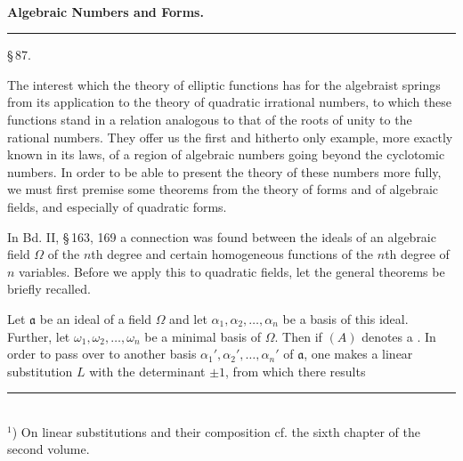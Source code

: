 
\begin{center}
\\[4pt]
\textbf{Algebraic Numbers and Forms.}
\end{center}

\begin{center}
\rule{0.25\textwidth}{0.4pt}
\end{center}

\begin{center}
\S\,87. 
\end{center}

The interest which the theory of elliptic functions has for the algebraist springs from its application to the theory of quadratic irrational numbers, to which these functions stand in a relation analogous to that of the roots of unity to the rational numbers. They offer us the first and hitherto only example, more exactly known in its laws, of a region of algebraic numbers going beyond the cyclotomic numbers. In order to be able to present the theory of these numbers more fully, we must first premise some theorems from the theory of forms and of algebraic fields, and especially of quadratic forms.

In Bd. II, \S\,163, 169 a connection was found between the ideals of an algebraic field $\Omega$ of the $n$th degree and certain homogeneous functions of the $n$th degree of $n$ variables. Before we apply this to quadratic fields, let the general theorems be briefly recalled.

Let $\mathfrak{a}$ be an ideal of a field $\Omega$ and let $\alpha_1, \alpha_2, \ldots, \alpha_n$ be a basis of this ideal. Further, let $\omega_1, \omega_2, \ldots, \omega_n$ be a minimal basis of $\Omega$. Then
if $(A)$ denotes a . In order to pass over to another basis $\alpha_1', \alpha_2', \ldots, \alpha_n'$ of $\mathfrak{a}$, one makes a linear substitution $L$ with the determinant $\pm 1$,
from which there results

\medskip
\noindent\rule{0.3\textwidth}{0.4pt}\\
$^{1}$) On linear substitutions and their composition cf. the sixth chapter of the second volume.
